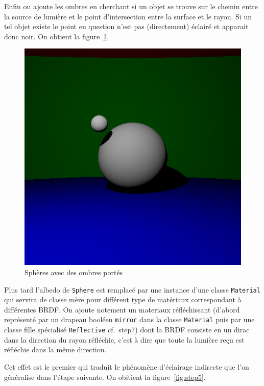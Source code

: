 \documentclass[12pt]{article}
\newcommand\id[1]{\texttt{#1}}
\begin{document}
Enfin on ajoute les ombres en cherchant si un objet se trouve sur le chemin entre la source de lumière et le point d'intersection entre la surface et le rayon.
Si un tel objet existe le point en question n'est pas (directement) éclairé et apparait donc noir.
On obtient la figure~\ref{fig:step4}.

\begin{figure}[ht]
  \centering
  \includegraphics[width=12cm]{../result/step4}
  \caption{Sphères avec des ombres portés}\label{fig:step4}
\end{figure}

Plus tard l'albedo de \id{Sphere} est remplacé par une instance d'une classe \id{Material} qui servira de classe mère pour différent type de matériaux correspondant à différentes BRDF.
On ajoute notement un materiaux réfléchissant (d'abord représenté par un drapeau booléen \id{mirror} dans la classe \id{Material} puis par une classe fille spécialisé \id{Reflective} cf.\ step7) dont la BRDF consiste en un dirac dans la direction du rayon réfléchie, c'est à dire que toute la lumière reçu est réfléchie dans la même direction.

Cet effet est le premier qui traduit le phénomène d'éclairage indirecte que l'on généralise dans l'étape suivante.
On obitient la figure~\ref{fig:step5}.
\end{document}
